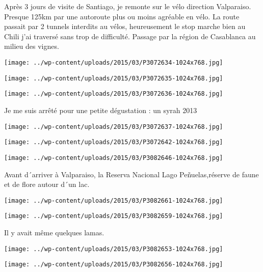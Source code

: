  Après 3 jours de visite de Santiago, je remonte sur le vélo direction Valparaiso. Presque 125km par une autoroute plus ou moins agréable en vélo. La route passait par 2 tunnels interdits au vélos, heureusement le stop marche bien au Chili j'ai traversé sans trop de difficulté. \newline
 Passage par la région de Casablanca au milieu des vignes. \newline
\centerline{\texttt{[image: ../wp-content/uploads/2015/03/P3072634-1024x768.jpg]} } 
 \newline
\centerline{\texttt{[image: ../wp-content/uploads/2015/03/P3072635-1024x768.jpg]} } 
 \newline
\centerline{\texttt{[image: ../wp-content/uploads/2015/03/P3072636-1024x768.jpg]} } 
  Je me suis arrêté pour une petite dégustation : un syrah 2013\newline
\centerline{\texttt{[image: ../wp-content/uploads/2015/03/P3072637-1024x768.jpg]} } 
 \newline
\centerline{\texttt{[image: ../wp-content/uploads/2015/03/P3072642-1024x768.jpg]} } 
 \newline
\centerline{\texttt{[image: ../wp-content/uploads/2015/03/P3082646-1024x768.jpg]} } 
Avant d´arriver à Valparaiso, la Reserva Nacional Lago Peñuelas,réserve de faune et de flore autour d´un lac. \newline
\centerline{\texttt{[image: ../wp-content/uploads/2015/03/P3082661-1024x768.jpg]} } 
 \newline
\centerline{\texttt{[image: ../wp-content/uploads/2015/03/P3082659-1024x768.jpg]} } 
 Il y avait même quelques lamas. \newline
\centerline{\texttt{[image: ../wp-content/uploads/2015/03/P3082653-1024x768.jpg]} } 
 \newline
\centerline{\texttt{[image: ../wp-content/uploads/2015/03/P3082656-1024x768.jpg]} } 
 \newline

\newpage
 
